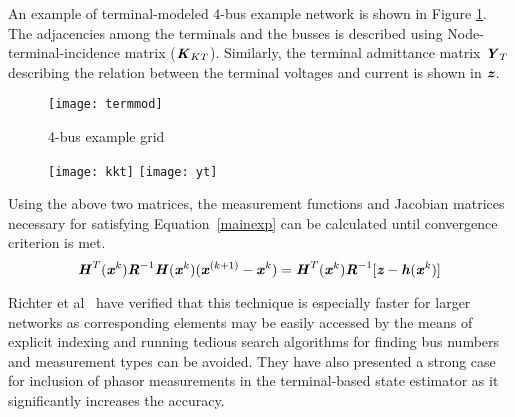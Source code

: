 \documentclass[thesis.tex]{subfiles}
\begin{document}
An example of terminal-modeled 4-bus example network is shown in Figure \ref{fig:termmod}. The adjacencies among the terminals and the busses is described using Node-terminal-incidence matrix ($\textbf{\textit{K}}_{KT}$). Similarly, the terminal admittance matrix $\textbf{\textit{Y}}_{T}$ describing the relation between the terminal voltages and current is shown in $\textbf{\textit{z}}$.
\begin{figure}[H]
	\centering
	\texttt{[image: termmod]}
	\caption{4-bus example grid~\cite{Richter}}
	\label{fig:termmod}
\end{figure}

\begin{figure}[H]
	\centering
	\texttt{[image: kkt]}
	\texttt{[image: yt]}
	\caption*{}
\end{figure}
Using the above two matrices, the measurement functions and Jacobian matrices necessary for satisfying Equation~\ref{mainexp} can be calculated until convergence criterion is met. 
\begin{equation}\label{mainexp}
\textbf{\textit{H}}^{T}(\textbf{\textit{x}}^{k})\textbf{\textit{R}}^{-1}\textbf{\textit{H}}(\textbf{\textit{x}}^{k})(\textbf{\textit{x}}^{(k+1)}-\textbf{\textit{x}}^{k}) = \textbf{\textit{H}}^{T}(\textbf{\textit{x}}^{k})\textbf{\textit{R}}^{-1}[\textbf{\textit{z}}-\textbf{\textit{h}}(\textbf{\textit{x}}^{k})]
\end{equation}

Richter et al~\cite{Richter} have verified that this technique is especially faster for larger networks as corresponding elements may be easily accessed by the means of explicit indexing and running tedious search algorithms for finding bus numbers and measurement types can be avoided. They have also presented a strong case for inclusion of phasor measurements in the terminal-based state estimator as it significantly increases the accuracy.
\end{document}
